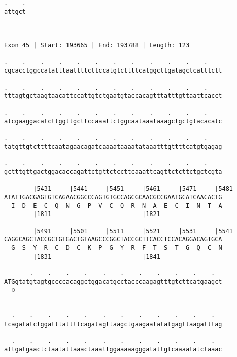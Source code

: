 \documentclass{article}
\begin{document}
\begin{Verbatim}
.    .
attgct
      
      
 
Exon 45 | Start: 193665 | End: 193788 | Length: 123
 
.    .    .    .    .    .    .    .    .    .    .    .    
cgcacctggccatatttaattttcttccatgtcttttcatggcttgatagctcatttctt
                                                            
.    .    .    .    .    .    .    .    .    .    .    .    
tttagtgctaagtaacattccattgtctgaatgtaccacagtttatttgttaattcacct
                                                            
.    .    .    .    .    .    .    .    .    .    .    .    
atcgaaggacatcttggttgcttccaaattctggcaataaataaagctgctgtacacatc
                                                            
.    .    .    .    .    .    .    .    .    .    .    .    
tatgttgtcttttcaatagaacagatcaaaataaaatataaatttgttttcatgtgagag
                                                            
.    .    .    .    .    .    .    .    .    .    .    .    
gctttgttgactggacaccagattctgttctccttcaaattcagttctcttctgctcgta
                                                            
        |5431     |5441     |5451     |5461     |5471     |5481
ATATTGACGAGTGTCAGAACGGCCCAGTGTGCCAGCGCAACGCCGAATGCATCAACACTG
  I  D  E  C  Q  N  G  P  V  C  Q  R  N  A  E  C  I  N  T  A
        |1811                         |1821                 
  
        |5491     |5501     |5511     |5521     |5531     |5541
CAGGCAGCTACCGCTGTGACTGTAAGCCCGGCTACCGCTTCACCTCCACAGGACAGTGCA
  G  S  Y  R  C  D  C  K  P  G  Y  R  F  T  S  T  G  Q  C  N
        |1831                         |1841                 
  
       .    .    .    .    .    .    .    .    .    .    .  
ATGgtatgtagtgccccacaggctggacatgcctacccaagagtttgtcttcatgaagct
  D                                                         
                                                            
  
  .    .    .    .    .    .    .    .    .    .    .    .  
tcagatatctggatttattttcagatagttaagctgaagaatatatgagttaagatttag
                                                            
  .    .    .    .    .    .    .    .    .    .    .    .  
attgatgaactctaatattaaactaaattggaaaaagggatattgtcaaaatatctaaac
                                                            

\end{Verbatim}
\end{document}
